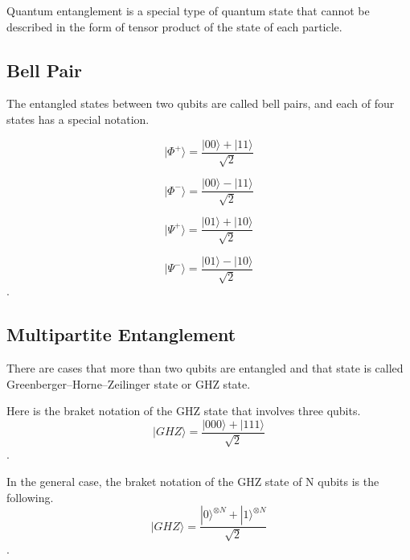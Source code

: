 Quantum entanglement is a special type of quantum state that cannot be described in the form of tensor product of the state of each particle.

\subsection{Bell Pair}
The entangled states between two qubits are called bell pairs, and each of four states has a special notation.

\begin{equation}
  |\Phi^+\rangle = \frac{|00\rangle + |11\rangle}{\sqrt{2}}
  \end{equation}
  
  \begin{equation}
 |\Phi^-\rangle = \frac{|00\rangle - |11\rangle}{\sqrt{2}}
 \end{equation}
 
 \begin{equation}
 |\Psi^+\rangle = \frac{|01\rangle + |10\rangle}{\sqrt{2}}
 \end{equation}
 
 \begin{equation}
  |\Psi^-\rangle = \frac{|01\rangle - |10\rangle}{\sqrt{2}}
  \end{equation}.

\subsection{Multipartite Entanglement}
There are cases that more than two qubits are entangled and that state is called Greenberger–Horne–Zeilinger state or GHZ state.

Here is the braket notation of the GHZ state that involves three qubits.
\begin{equation}
  |GHZ\rangle = \frac{|000\rangle + |111\rangle}{\sqrt{2}}
\end{equation}.

In the general case, the braket notation of the GHZ state of N qubits is the following.
\begin{equation}
  |GHZ\rangle = \frac{|0\rangle^{\otimes N} + |1\rangle^{\otimes N}}{\sqrt{2}}
\end{equation}.

